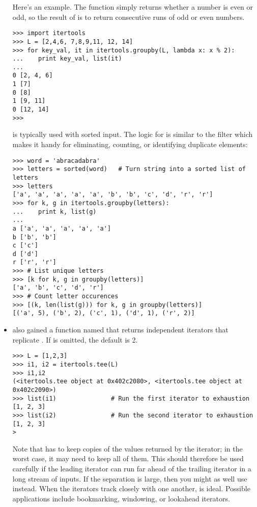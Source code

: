 \documentclass{howto}
\begin{document}
\begin{itemize}
Here's an example.  The  function simply returns whether a
number is even or odd, so the result of  is to
return consecutive runs of odd or even numbers.

\begin{verbatim}
>>> import itertools
>>> L = [2,4,6, 7,8,9,11, 12, 14]
>>> for key_val, it in itertools.groupby(L, lambda x: x % 2):
...    print key_val, list(it)
... 
0 [2, 4, 6]
1 [7]
0 [8]
1 [9, 11]
0 [12, 14]
>>> 
\end{verbatim}

 is typically used with sorted input.  The logic
for  is similar to the \UNIX{}  filter
which makes it handy for eliminating, counting, or identifying
duplicate elements:

\begin{verbatim}
>>> word = 'abracadabra'
>>> letters = sorted(word)   # Turn string into a sorted list of letters
>>> letters 
['a', 'a', 'a', 'a', 'a', 'b', 'b', 'c', 'd', 'r', 'r']
>>> for k, g in itertools.groupby(letters):
...    print k, list(g)
... 
a ['a', 'a', 'a', 'a', 'a']
b ['b', 'b']
c ['c']
d ['d']
r ['r', 'r']
>>> # List unique letters
>>> [k for k, g in groupby(letters)]                     
['a', 'b', 'c', 'd', 'r']
>>> # Count letter occurences
>>> [(k, len(list(g))) for k, g in groupby(letters)]     
[('a', 5), ('b', 2), ('c', 1), ('d', 1), ('r', 2)]
\end{verbatim}

\item {} also gained a function named
 that returns  independent
iterators that replicate .  If  is omitted, the
default is 2.

\begin{verbatim}
>>> L = [1,2,3]
>>> i1, i2 = itertools.tee(L)
>>> i1,i2
(<itertools.tee object at 0x402c2080>, <itertools.tee object at 0x402c2090>)
>>> list(i1)               # Run the first iterator to exhaustion
[1, 2, 3]
>>> list(i2)               # Run the second iterator to exhaustion
[1, 2, 3]
>\end{verbatim}

Note that  has to keep copies of the values returned 
by the iterator; in the worst case, it may need to keep all of them.  
This should therefore be used carefully if the leading iterator
can run far ahead of the trailing iterator in a long stream of inputs.
If the separation is large, then you might as well use 
 instead.  When the iterators track closely with one
another,  is ideal.  Possible applications include
bookmarking, windowing, or lookahead iterators.


\end{itemize}
\end{document}
